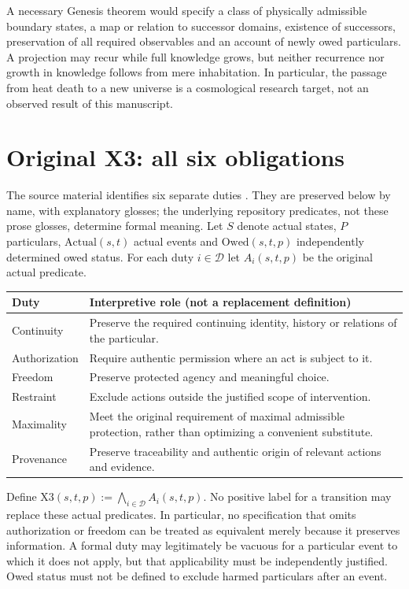 \documentclass[11pt,a4paper]{article}
\newcommand{\Xthree}{\mathrm{X3}}\newcommand{\Owed}{\mathrm{Owed}}\newcommand{\Act}{\mathrm{Actual}}\newcommand{\Empty}{\varnothing}\newcommand{\Gthree}{\mathrm{G3}}\newcommand{\Dut}{\mathcal D}
\begin{document}
A necessary Genesis theorem would specify a class of physically admissible boundary states, a map or relation to successor domains, existence of successors, preservation of all required observables and an account of newly owed particulars. A projection may recur while full knowledge grows, but neither recurrence nor growth in knowledge follows from mere inhabitation. In particular, the passage from heat death to a new universe is a cosmological research target, not an observed result of this manuscript.
\section{Original X3: all six obligations}
The source material identifies six separate duties \cite{sourcegate}. They are preserved below by name, with explanatory glosses; the underlying repository predicates, not these prose glosses, determine formal meaning. Let $S$ denote actual states, $P$ particulars, $\Act(s,t)$ actual events and $\Owed(s,t,p)$ independently determined owed status. For each duty $i\in\Dut$ let $A_i(s,t,p)$ be the original actual predicate.
\begin{center}
\begin{tabularx}{\linewidth}{@{}lX@{}}\toprule
Duty & Interpretive role (not a replacement definition)\\\midrule
Continuity & Preserve the required continuing identity, history or relations of the particular.\\
Authorization & Require authentic permission where an act is subject to it.\\
Freedom & Preserve protected agency and meaningful choice.\\
Restraint & Exclude actions outside the justified scope of intervention.\\
Maximality & Meet the original requirement of maximal admissible protection, rather than optimizing a convenient substitute.\\
Provenance & Preserve traceability and authentic origin of relevant actions and evidence.\\\bottomrule
\end{tabularx}
\end{center}
Define $\Xthree(s,t,p):=\bigwedge_{i\in\Dut}A_i(s,t,p)$. No positive label for a transition may replace these actual predicates. In particular, no specification that omits authorization or freedom can be treated as equivalent merely because it preserves information. A formal duty may legitimately be vacuous for a particular event to which it does not apply, but that applicability must be independently justified. Owed status must not be defined to exclude harmed particulars after an event.
\end{document}
